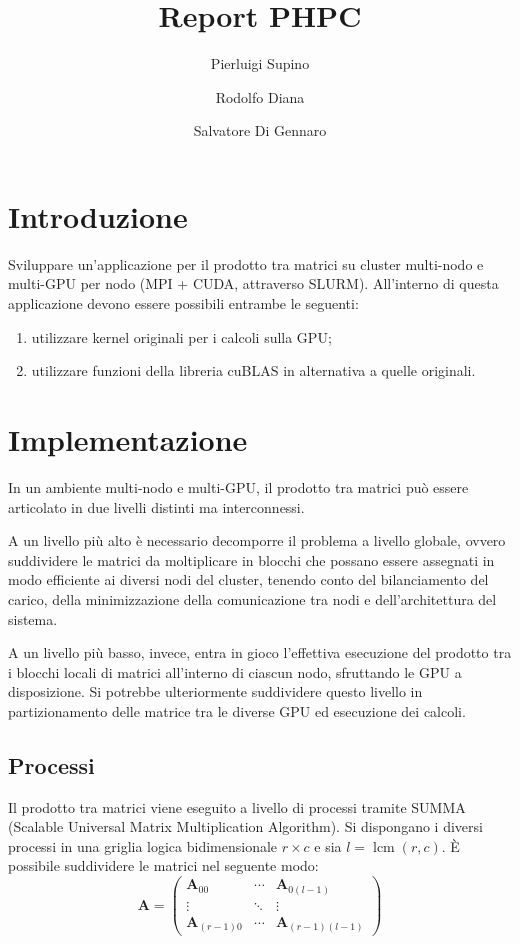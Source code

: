 \documentclass[a4paper]{article}
\title{Report PHPC}
\author{Pierluigi Supino \and Rodolfo Diana \and Salvatore Di Gennaro}
\DeclareMathOperator{\lcm}{lcm}
\begin{document}
\maketitle
\tableofcontents

\section{Introduzione}

Sviluppare un’applicazione per il prodotto tra matrici su cluster multi-nodo e multi-GPU per nodo (MPI + CUDA, attraverso SLURM). All’interno di questa applicazione devono essere possibili entrambe le seguenti:
\begin{enumerate}
    \item utilizzare kernel originali per i calcoli sulla GPU;
    \item utilizzare funzioni della libreria cuBLAS in alternativa a quelle originali.
\end{enumerate}

\section{Implementazione}
In un ambiente multi-nodo e multi-GPU, il prodotto tra matrici può essere articolato in due livelli distinti ma interconnessi.

A un livello più alto è necessario decomporre il problema a livello globale, ovvero suddividere le matrici da moltiplicare in blocchi che possano essere assegnati in modo efficiente ai diversi nodi del cluster, tenendo conto del bilanciamento del carico, della minimizzazione della comunicazione tra nodi e dell'architettura del sistema.

A un livello più basso, invece, entra in gioco l’effettiva esecuzione del prodotto tra i blocchi locali di matrici all’interno di ciascun nodo, sfruttando le GPU a disposizione. Si potrebbe ulteriormente suddividere questo livello in partizionamento delle matrice tra le diverse GPU ed esecuzione dei calcoli.

\subsection{Processi}
Il prodotto tra matrici viene eseguito a livello di processi tramite SUMMA (Scalable Universal Matrix Multiplication Algorithm)\cite{SUMMA}.
Si dispongano i diversi processi in una griglia logica bidimensionale $r \times c$ e sia $l=\lcm(r, c)$. È possibile suddividere le matrici nel seguente modo:
$$
    \mathbf{A}=
    \begin{pmatrix}
        \mathbf{A}_{00}     & \cdots & \mathbf{A}_{0(l-1)}     \\
        \vdots              & \ddots & \vdots                  \\
        \mathbf{A}_{(r-1)0} & \cdots & \mathbf{A}_{(r-1)(l-1)}
    \end{pmatrix}
$$
\end{document}
